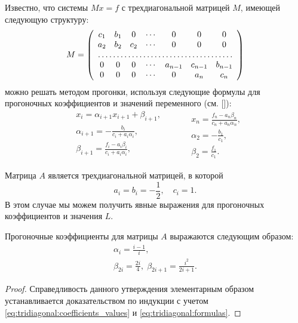 Известно, что системы $ Mx = f $ с трехдиагональной матрицей $ M $, имеющей следующую структуру:
\[
M = \left(\begin{array}{ccccccc}
c_1 & b_1 & 0 & \cdots & 0 & 0 & 0 \\
a_2 & b_2 & c_2 & \cdots & 0 & 0 & 0 \\
\hdotsfor{7} \\
0 & 0 & 0 & \cdots & a_{n-1} & c_{n-1} & b_{n-1} \\
0 & 0 & 0 & \cdots & 0 & a_n & c_n
\end{array}\right)
\]
можно решать методом прогонки, используя следующие формулы для прогоночных коэффициентов и значений переменного (см. [\samarsky]):
\begin{equation}
\label{eq:tridiagonal:formulas}
\begin{split}
    &x_i = \alpha_{i+1} x_{i+1} + \beta_{i+1}, \\
    &\alpha_{i+1} = -\frac{b_i}{c_i + a_i\alpha_i}, \\
    &\beta_{i+1} = \frac{f_i - a_i\beta_i}{c_i + a_i\alpha_i}, \\
\end{split}
\qquad
\begin{split}
    &x_n = \frac{f_n - a_n\beta_n}{c_n + a_n\alpha_n}, \\
    &\alpha_2 = -\frac{b_1}{c_1}, \\
    &\beta_2 = \frac{f_1}{c_1}.
\end{split}
\end{equation}

Матрица $ A $ является трехдиагональной матрицей, в которой 
\begin{equation}
\label{eq:tridiagonal:coefficients_values}
a_i = b_i = -\frac{1}{2}, \quad c_i = 1.
\end{equation}
В этом случае мы можем получить явные выражения для прогоночных коэффициентов и значения $ L $.

\begin{utver}
\label{utver:tridiagonal:coefficients}
Прогоночные коэффициенты для матрицы $ A $ выражаются следующим образом:
\begin{gather*}
\label{eq:tridiagonal:alpha}
  \alpha_i = \frac{i-1}{i}, \\
  \label{eq:tridiagonal:beta}
  \beta_{2i} = \frac{2i}{4}, \;
  \beta_{2i+1} = \frac{i^2}{2i+1}.
\end{gather*}
\end{utver}
\begin{proof}
Справедливость данного утверждения элементарным образом устанавливается доказательством по индукции с учетом \eqref{eq:tridiagonal:coefficients_values} и \eqref{eq:tridiagonal:formulas}.
\end{proof}

